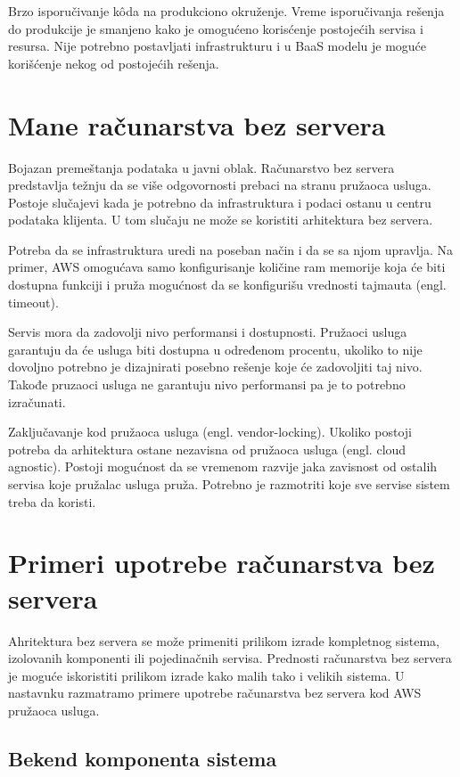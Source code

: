 \documentclass[12pt,oneside]{memoir}
\begin{document}
Brzo isporučivanje kôda na produkciono okruženje. Vreme isporučivanja rešenja do produkcije je smanjeno kako je omogućeno korisćenje postojećih servisa i resursa. Nije potrebno postavljati infrastrukturu i u BaaS modelu je moguće korišćenje nekog od postojećih rešenja.

\section{Mane računarstva bez servera}

Bojazan premeštanja podataka u javni oblak. Računarstvo bez servera predstavlja težnju da se više odgovornosti prebaci na stranu pružaoca usluga. Postoje slučajevi kada je potrebno da infrastruktura i podaci ostanu u centru podataka klijenta. U tom slučaju ne može se koristiti arhitektura bez servera\cite{sa}.

Potreba da se infrastruktura uredi na poseban način i da se sa njom upravlja. Na primer, AWS omogućava samo konfigurisanje količine ram memorije koja će biti dostupna funkciji i pruža mogućnost da se konfigurišu vrednosti tajmauta (engl. timeout). %

Servis mora da zadovolji nivo performansi i dostupnosti. Pružaoci usluga garantuju da će usluga biti dostupna u određenom procentu, ukoliko to nije dovoljno potrebno je dizajnirati posebno rešenje koje će zadovoljiti taj nivo. Takođe pruzaoci usluga ne garantuju nivo performansi pa je to potrebno izračunati\cite{sa}.

Zaključavanje kod pružaoca usluga (engl. vendor-locking). Ukoliko postoji potreba da arhitektura ostane nezavisna od pružaoca usluga (engl. cloud agnostic). Postoji mogućnost da se vremenom razvije jaka zavisnost od ostalih servisa koje pružalac usluga pruža. Potrebno je razmotriti koje sve servise sistem treba da koristi.
 

\section{Primeri upotrebe računarstva bez servera}

Ahritektura bez servera se može primeniti prilikom izrade kompletnog sistema, izolovanih komponenti ili pojedinačnih servisa. Prednosti računarstva bez servera je moguće iskoristiti prilikom izrade kako malih tako i velikih sistema\cite{sa}. U nastavnku razmatramo primere upotrebe računarstva bez servera kod AWS pružaoca usluga.

\subsection{Bekend komponenta sistema}
\end{document}
